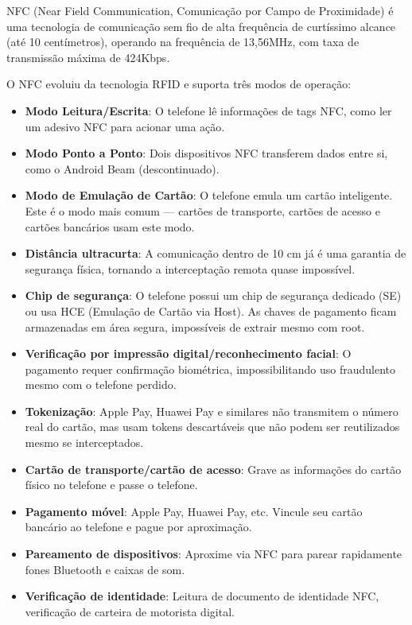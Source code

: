 
NFC (Near Field Communication, Comunicação por Campo de Proximidade) é uma tecnologia de comunicação sem fio de alta frequência de curtíssimo alcance (até 10 centímetros), operando na frequência de 13,56MHz, com taxa de transmissão máxima de 424Kbps.


O NFC evoluiu da tecnologia RFID e suporta três modos de operação:

\begin{itemize}
  \item \textbf{Modo Leitura/Escrita}: O telefone lê informações de tags NFC, como ler um adesivo NFC para acionar uma ação.
  \item \textbf{Modo Ponto a Ponto}: Dois dispositivos NFC transferem dados entre si, como o Android Beam (descontinuado).
  \item \textbf{Modo de Emulação de Cartão}: O telefone emula um cartão inteligente. Este é o modo mais comum — cartões de transporte, cartões de acesso e cartões bancários usam este modo.
\end{itemize}


\begin{itemize}
  \item \textbf{Distância ultracurta}: A comunicação dentro de 10 cm já é uma garantia de segurança física, tornando a interceptação remota quase impossível.
  \item \textbf{Chip de segurança}: O telefone possui um chip de segurança dedicado (SE) ou usa HCE (Emulação de Cartão via Host). As chaves de pagamento ficam armazenadas em área segura, impossíveis de extrair mesmo com root.
  \item \textbf{Verificação por impressão digital/reconhecimento facial}: O pagamento requer confirmação biométrica, impossibilitando uso fraudulento mesmo com o telefone perdido.
  \item \textbf{Tokenização}: Apple Pay, Huawei Pay e similares não transmitem o número real do cartão, mas usam tokens descartáveis que não podem ser reutilizados mesmo se interceptados.
\end{itemize}


\begin{itemize}
  \item \textbf{Cartão de transporte/cartão de acesso}: Grave as informações do cartão físico no telefone e passe o telefone.
  \item \textbf{Pagamento móvel}: Apple Pay, Huawei Pay, etc. Vincule seu cartão bancário ao telefone e pague por aproximação.
  \item \textbf{Pareamento de dispositivos}: Aproxime via NFC para parear rapidamente fones Bluetooth e caixas de som.
  \item \textbf{Verificação de identidade}: Leitura de documento de identidade NFC, verificação de carteira de motorista digital.
\end{itemize}


